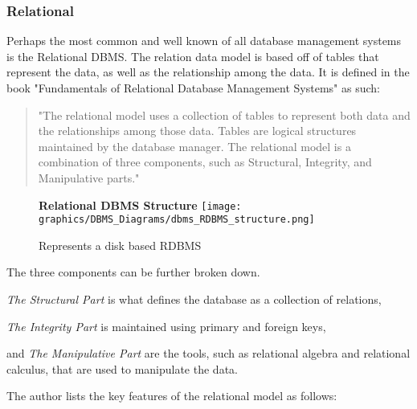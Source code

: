 \documentclass[letterpaper, 12pt]{article}
\begin{document}
\subsubsection{Relational}
Perhaps the most common and well known of all database management systems is the
Relational DBMS. The relation data model is based off of tables that represent 
the data, as well as the relationship among the data. It is defined in the book 
"Fundamentals of Relational Database Management Systems" as such:
\begin{quote}
"The relational model uses a collection of tables to represent both data and
the relationships among those data. Tables are logical structures maintained
by the database manager. The relational model is a combination of three
components, such as Structural, Integrity, and Manipulative parts."
\cite{sumathi2007fundamentals}
\end{quote}
\begin{figure}
  \centering
  \textbf{Relational DBMS Structure}
  \texttt{[image: graphics/DBMS\_Diagrams/dbms\_RDBMS\_structure.png]}
  \caption{Represents a disk based RDBMS}
\end{figure}
The three components can be further broken down.
\par\vspace{\baselineskip}
\textit{The Structural Part} is what defines the database as a collection of relations,
\par\vspace{\baselineskip}
\textit{The Integrity Part} is maintained using primary and foreign keys,
\par\vspace{\baselineskip}and 
\textit{The Manipulative Part} are the tools, such as relational algebra and 
relational calculus, that are used to manipulate the data.
\par\vspace{\baselineskip}
The author lists the key features of the relational model as follows: 
\end{document}
